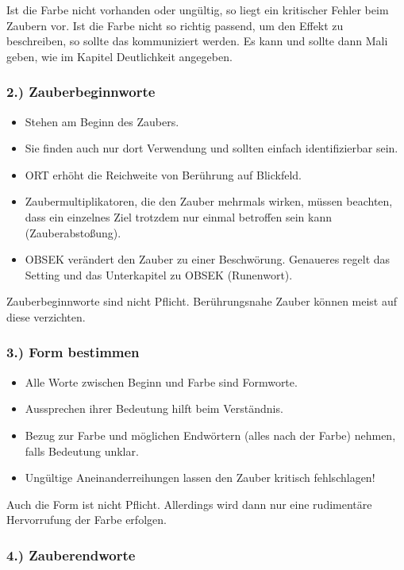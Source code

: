 \documentclass{article}
\begin{document}
Ist die Farbe nicht vorhanden oder ungültig, so liegt ein kritischer Fehler beim Zaubern vor. Ist die Farbe nicht so
richtig passend, um den Effekt zu beschreiben, so sollte das kommuniziert werden. Es kann und sollte dann Mali geben,
wie im Kapitel Deutlichkeit angegeben.

\subsubsection{2.) Zauberbeginnworte}

\begin{itemize}
\item Stehen am Beginn des Zaubers.
\item Sie finden auch nur dort Verwendung und sollten einfach identifizierbar sein.
\item ORT erhöht die Reichweite von Berührung auf Blickfeld.
\item Zaubermultiplikatoren, die den Zauber mehrmals wirken, müssen beachten, dass ein einzelnes Ziel trotzdem nur einmal betroffen sein kann (Zauberabstoßung).
\item OBSEK verändert den Zauber zu einer Beschwörung. Genaueres regelt das Setting und das Unterkapitel zu OBSEK (Runenwort).
\end{itemize}

Zauberbeginnworte sind nicht Pflicht. Berührungsnahe Zauber können meist auf diese verzichten.

\subsubsection{3.) Form bestimmen}

\begin{itemize}
\item Alle Worte zwischen Beginn und Farbe sind Formworte.
\item Aussprechen ihrer Bedeutung hilft beim Verständnis.
\item Bezug zur Farbe und möglichen Endwörtern (alles nach der Farbe) nehmen, falls Bedeutung unklar.
\item Ungültige Aneinanderreihungen lassen den Zauber kritisch fehlschlagen!
\end{itemize}

Auch die Form ist nicht Pflicht. Allerdings wird dann nur eine rudimentäre Hervorrufung der Farbe erfolgen.

\subsubsection{4.) Zauberendworte}
\end{document}
